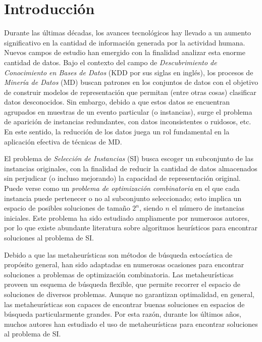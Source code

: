 \chapter*{Introducción}
\label{intro}

Durante las últimas décadas, los avances tecnológicos hay llevado a un aumento significativo en la cantidad de información generada por la actividad humana. Nuevos campos de estudio han emergido con la finalidad analizar esta enorme cantidad de datos. Bajo el contexto del campo de \emph{Descubrimiento de Conocimiento en Bases de Datos} (KDD por sus siglas en inglés), los procesos de \emph{Minería de Datos} (MD) buscan patrones en los conjuntos de datos con el objetivo de construir modelos de representación que permitan (entre otras cosas) clasificar datos desconocidos. Sin embargo, debido a que estos datos se encuentran agrupados en muestras de un evento particular (o instancias), surge el problema de aparición de instancias redundantes, con datos inconsistentes o ruidosos, etc. En este sentido, la reducción de los datos juega un rol fundamental en la aplicación efectiva de técnicas de MD.

El problema de \emph{Selección de Instancias} (SI) busca escoger un subconjunto de las instancias originales, con la finalidad de reducir la cantidad de datos almacenados sin perjudicar (o incluso mejorando) la capacidad de representación original. Puede verse como un \emph{problema de optimización combinatoria} en el que cada instancia puede pertenecer o no al subconjunto seleccionado; esto implica un espacio de posibles soluciones de tamaño $2^n$, siendo $n$ el número de instancias iniciales. Este problema ha sido estudiado ampliamente por numerosos autores, por lo que existe abundante literatura sobre algoritmos heurísticos para encontrar soluciones al problema de SI.

Debido a que las metaheurísticas son métodos de búsqueda estocástica de propósito general, han sido adaptadas en numerosas ocasiones para encontrar soluciones a problemas de optimización combinatoria. Las metaheurísticas proveen un esquema de búsqueda flexible, que permite recorrer el espacio de soluciones de diversos problemas. Aunque no garantizan optimalidad, en general, las metaheurísticas son capaces de encontrar buenas soluciones en espacios de búsqueda particularmente grandes. Por esta razón, durante los últimos años, muchos autores han estudiado el uso de metaheurísticas para encontrar soluciones al problema de SI.

